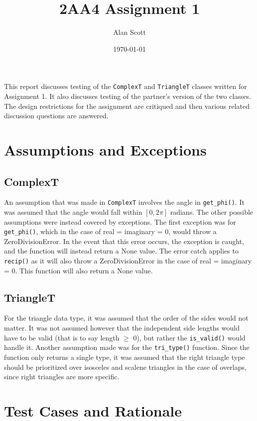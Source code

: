 \documentclass[12pt]{article}
\title{2AA4 Assignment 1}
\author{Alan Scott}
\date{\today}
\begin{document}
\maketitle

This report discusses testing of the \verb|ComplexT| and \verb|TriangleT|
classes written for Assignment 1. It also discusses testing of the partner's
version of the two classes. The design restrictions for the assignment
are critiqued and then various related discussion questions are answered.

\section{Assumptions and Exceptions} \label{AssumptAndExcept}
\subsection*{ComplexT}
An assumption that was made in \verb|ComplexT| involves the angle in \verb|get_phi()|. It was assumed that the angle would fall within $[0,2\pi]$ radians. The other possible assumptions were instead covered by exceptions. The first exception was for \verb|get_phi()|, which in the case of real = imaginary = 0, would throw a ZeroDivisionError. In the event that this error occurs, the exception is caught, and the function will instead return a None value. The error catch applies to \verb|recip()| as it will also throw a ZeroDivisionError in the case of real = imaginary = 0. This function will also return a None value. 

\subsection*{TriangleT}
For the triangle data type, it was assumed that the order of the sides would not matter. It was not assumed however that the independent side lengths would have to be valid (that is to say length $\geq$ 0), but rather the \verb|is_valid()| would handle it. Another assumption made was for the \verb|tri_type()| function. Since the function only returns a single type, it was assumed that the right triangle type should be prioritized over isosceles and scalene triangles in the case of overlaps, since right triangles are more specific. 

\section{Test Cases and Rationale} \label{Testing}
\end{document}
